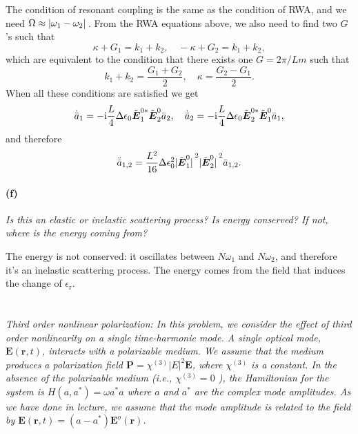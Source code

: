 \documentclass[hyperref, a4paper]{article}
\newcommand*{\ii}{\mathrm{i}}
\newcommand{\epsr}{\epsilon_{\text{r}}}
\newcommand*{\mvb}[1]{\tilde{\vb*{#1}}}
\begin{document}
The condition of resonant coupling is the same as the condition of RWA, 
and we need $\Omega \approx \abs*{\omega_1 - \omega_2}$.
From the RWA equations above, we also need to find two $G$'s such that 
\begin{equation}
    \kappa + G_1 = k_1 + k_2, \quad - \kappa + G_2 = k_1 + k_2,
\end{equation}
which are equivalent to the condition that there exists one $G = 2\pi / L m$ such that 
\begin{equation}
    k_1 + k_2 = \frac{G_1 + G_2}{2}, \quad 
    \kappa = \frac{G_2 - G_1}{2}. 
\end{equation}
When all these conditions are satisfied we get 
\begin{equation}
    \dot{\bar{a}}_1 = - \ii \frac{L}{4} \Delta \epsilon_0 \mvb{E}_1^{0*} \mvb{E}_2^0 \bar{a}_2, \quad 
    \dot{\bar{a}}_2 = - \ii \frac{L}{4} \Delta \epsilon_0 \mvb{E}_2^{0*} \mvb{E}_1^0 \bar{a}_1,
\end{equation}
and therefore 
\begin{equation}
    \ddot{\bar{a}}_{1,2} = \frac{L^2}{16} \Delta \epsilon_0^2 \abs*{\mvb{E}_1^0}^2 \abs*{\mvb{E}_2^0}^2 \bar{a}_{1,2}.
\end{equation}

\paragraph*{(f)} \textit{Is this an elastic or inelastic scattering process? Is energy conserved? If not, where is the energy coming from?} 

The energy is not conserved: it oscillates between $N \omega_1$ and $N \omega_2$, 
and therefore it's an inelastic scattering process.
The energy comes from the field that induces the change of $\epsr$.

\section{}

\subsection{}

\textit{Third order nonlinear polarization: In this problem, we consider the effect of third order nonlinearity on a single time-harmonic mode. A single optical mode, $\mathbf{E}(\mathbf{r}, t)$, interacts with a polarizable medium. We assume that the medium produces a polarization field $\mathbf{P}=\chi^{(3)}|E|^2 \mathbf{E}$, where $\chi^{(3)}$ is a constant. In the absence of the polarizable medium (i.e., $\chi^{(3)}=0$ ), the Hamiltonian for the system is $H\left(a, a^*\right)=\omega a^* a$ where $a$ and $a^*$ are the complex mode amplitudes. As we have done in lecture, we assume that the mode amplitude is related to the field by $\mathbf{E}(\mathbf{r}, t)=\left(a-a^*\right) \mathbf{E}^o(\mathbf{r})$.}
\end{document}
